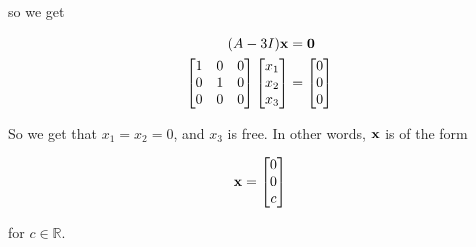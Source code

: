 \documentclass[12pt]{article}
\renewcommand{\vec}[1]{
  {\bf #1}
}
\begin{document}
{    so we get

    \begin{align*}
      (A - 3I)\vec{x} &= \vec{0} \\
      \begin{bmatrix}
        1 &  0 & 0 \\
        0 &  1 & 0 \\
        0 &  0 & 0 \\
      \end{bmatrix}
      \begin{bmatrix}
        x_1 \\
        x_2 \\
        x_3 \\
      \end{bmatrix}
      &=
      \begin{bmatrix}
        0 \\
        0 \\
        0 \\
      \end{bmatrix}
    \end{align*}

    So we get that $x_1 = x_2 = 0$, and $x_3$ is free. In other words, $\vec{x}$
    is of the form

    \[
      \vec{x} = \begin{bmatrix}
        0 \\
        0 \\
        c \\
      \end{bmatrix}
    \]

    for $c \in \mathbb R$.

}
\end{document}
